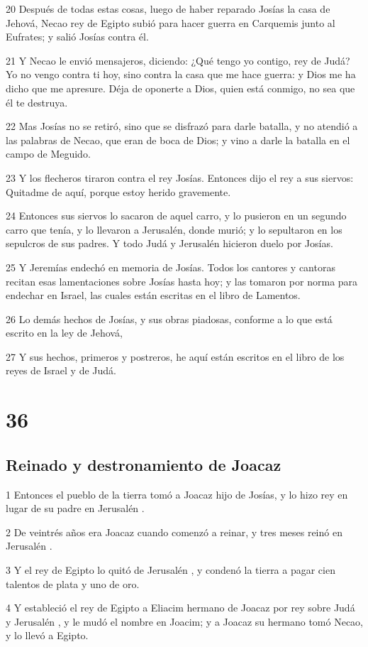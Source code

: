 \par 20 Después de todas estas cosas, luego de haber reparado Josías la casa de Jehová, Necao rey de Egipto subió para hacer guerra en Carquemis junto al Eufrates; y salió Josías contra él.
\par 21 Y Necao le envió mensajeros, diciendo: ¿Qué tengo yo contigo, rey de Judá? Yo no vengo contra ti hoy, sino contra la casa que me hace guerra: y Dios me ha dicho que me apresure. Déja de oponerte a Dios, quien está conmigo, no sea que él te destruya.
\par 22 Mas Josías no se retiró, sino que se disfrazó para darle batalla, y no atendió a las palabras de Necao, que eran de boca de Dios; y vino a darle la batalla en el campo de Meguido.
\par 23 Y los flecheros tiraron contra el rey Josías. Entonces dijo el rey a sus siervos: Quitadme de aquí, porque estoy herido gravemente.
\par 24 Entonces sus siervos lo sacaron de aquel carro, y lo pusieron  en un segundo carro que tenía, y lo llevaron a Jerusalén, donde murió; y lo sepultaron en los sepulcros de sus padres. Y todo Judá y Jerusalén  hicieron duelo por Josías.
\par 25 Y Jeremías endechó en memoria de Josías. Todos los cantores y cantoras recitan esas lamentaciones sobre Josías hasta hoy; y las tomaron por norma para endechar en Israel, las cuales están escritas en el libro de Lamentos.
\par 26 Lo demás hechos de Josías, y sus obras piadosas, conforme a lo que está escrito en la ley de Jehová,
\par 27 Y sus hechos, primeros y postreros, he aquí están escritos en el libro de los reyes de Israel y de Judá.

\chapter{36}

\section*{Reinado y destronamiento de Joacaz}

\par 1 Entonces el pueblo de la tierra tomó a Joacaz hijo de Josías, y lo hizo rey en lugar de su padre en Jerusalén .
\par 2 De veintrés años era Joacaz cuando comenzó a reinar,  y tres meses reinó en Jerusalén .
\par 3 Y el rey de Egipto lo quitó de Jerusalén , y condenó la tierra a pagar cien talentos de plata   y uno de oro.
\par 4 Y estableció el rey de Egipto a Eliacim hermano de Joacaz por rey sobre Judá y Jerusalén , y le mudó el nombre en Joacim; y a Joacaz su hermano tomó Necao, y lo llevó a Egipto. 

